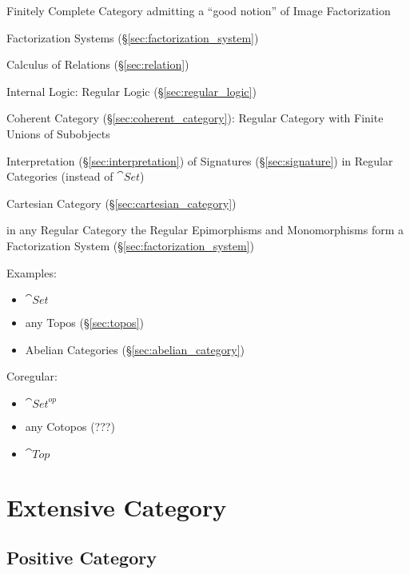Finitely Complete Category admitting a ``good notion'' of Image
Factorization

\fist Factorization Systems (\S\ref{sec:factorization_system})

Calculus of Relations (\S\ref{sec:relation})

Internal Logic: Regular Logic (\S\ref{sec:regular_logic})

Coherent Category (\S\ref{sec:coherent_category}): Regular Category
with Finite Unions of Subobjects

Interpretation (\S\ref{sec:interpretation}) of Signatures
(\S\ref{sec:signature}) in Regular Categories (instead of $\cat{Set}$)

Cartesian Category (\S\ref{sec:cartesian_category})

in any Regular Category the Regular Epimorphisms and Monomorphisms
form a Factorization System (\S\ref{sec:factorization_system})

Examples:

\begin{itemize}
  \item $\cat{Set}$
  \item any Topos (\S\ref{sec:topos})
  \item Abelian Categories (\S\ref{sec:abelian_category})
\end{itemize}

Coregular:

\begin{itemize}
  \item $\cat{Set}^{op}$
  \item any Cotopos (???)
  \item $\cat{Top}$
\end{itemize}



\section{Extensive Category}\label{sec:extensive_category}

\subsection{Positive Category}\label{sec:positive_category}

